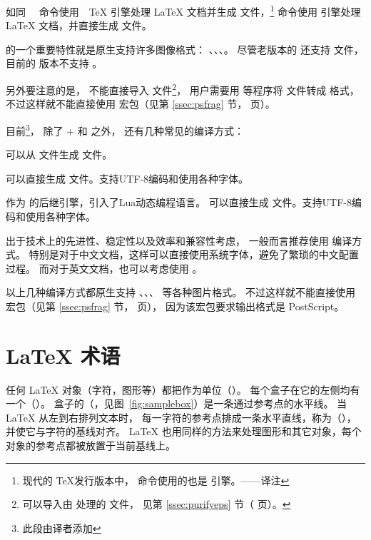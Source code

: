 如同 　命令使用　\TeX{} 引擎处理 \LaTeX{} 文档并生成  文件，\footnote{
现代的 \TeX 发行版本中， 命令使用的也是 \pdfTeX{} 引擎。——译注}
 命令使用 \pdfTeX{} 引擎处理 \LaTeX{} 文档，并直接生成  文件。
 
\pdfTeX{} 的一个重要特性就是原生支持许多图像格式：
、、、\MetaPost。
尽管老版本的 \pdfTeX{} 还支持  文件，目前的 \pdfTeX{} 版本不支持 。

另外要注意的是，\pdfTeX{} 不能直接导入  文件\footnote{
    \pdfTeX{} 可以导入由  处理的  文件，
	见第 \ref{ssec:purifyeps} 节（\pageref{ssec:purifyeps} 页）。}，
用户需要用  等程序将  文件转成  格式，
不过这样就不能直接使用  宏包（见第 \ref{ssec:psfrag} 节，\pageref{ssec:psfrag} 页）。

目前\footnote{
    此段由译者添加}，
除了 + 和  之外，
还有几种常见的编译方式：
\begin{description}
	\item {} 可以从  文件生成  文件。
	\item {} 可以直接生成  文件。支持UTF-8编码和使用各种字体。
	\item {} 作为  的后继引擎，引入了Lua动态编程语言。
	可以直接生成  文件。支持UTF-8编码和使用各种字体。
\end{description}
出于技术上的先进性、稳定性以及效率和兼容性考虑，
一般而言推荐使用  编译方式。
特别是对于中文文档，这样可以直接使用系统字体，避免了繁琐的中文配置过程。
而对于英文文档，也可以考虑使用 。

以上几种编译方式都原生支持 、、、 等各种图片格式。
不过这样就不能直接使用  宏包（见第 \ref{ssec:psfrag} 节，\pageref{ssec:psfrag} 页），
因为该宏包要求输出格式是 PostScript。


\section{\LaTeX{} 术语}\label{sec:terminology}

任何 \LaTeX{} 对象（字符，图形等）都把作为单位（\cite[103页]{Lamport1994}）。
每个盒子在它的左侧均有一个（）。
盒子的（，见图~\ref{fig:samplebox}）是一条通过参考点的水平线。
当 \LaTeX{} 从左到右排列文本时，
每一字符的参考点排成一条水平直线，称为（），
并使它与字符的基线对齐。
\LaTeX{} 也用同样的方法来处理图形和其它对象，每个对象的参考点都被放置于当前基线上。

